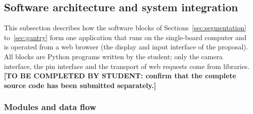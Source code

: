 \subsection{Software architecture and system integration}
\label{sec:system}

This subsection describes how the software blocks of Sections~\ref{sec:segmentation} to~\ref{sec:gantry} form one application that runs on the single-board computer and is operated from a web browser (the display and input interface of the proposal).
All blocks are Python programs written by the student; only the camera interface, the pin interface and the transport of web requests come from libraries.
\textbf{[TO BE COMPLETED BY STUDENT: confirm that the complete source code has been submitted separately.]}

\subsubsection{Modules and data flow}

